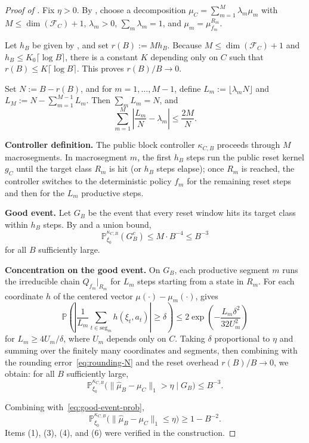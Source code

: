 \documentclass[12pt,a4paper]{article}
\theoremstyle{definition}
\begin{document}
\begin{proof}[Proof of ]
Fix $\eta > 0$. By , choose a decomposition $\mu_C = \sum_{m=1}^M \lambda_m \mu_m$ with $M \leq \dim(\mathcal{F}_C) + 1$, $\lambda_m > 0$, $\sum_m \lambda_m = 1$, and $\mu_m = \mu_{f_m}^{R_m}$.

Let $h_B$ be given by , and set $r(B) := M h_B$. Because $M \leq \dim(\mathcal{F}_C) + 1$ and $h_B \leq K_0 \lceil \log B \rceil$, there is a constant $K$ depending only on $C$ such that $r(B) \leq K \lceil \log B \rceil$. This proves $r(B)/B \to 0$.

Set $N := B - r(B)$, and for $m = 1, \ldots, M-1$, define $L_m := \lfloor \lambda_m N \rfloor$ and $L_M := N - \sum_{m=1}^{M-1} L_m$. Then $\sum_m L_m = N$, and
\begin{equation}\label{eq:rounding-N}
\sum_{m=1}^M \left|\frac{L_m}{N} - \lambda_m\right| \leq \frac{2M}{N}.
\end{equation}

\textbf{Controller definition.}  The public block controller $\kappa_{C,B}$ proceeds through $M$ macrosegments.  In macrosegment $m$, the first $h_B$ steps run the public reset kernel $g_C$ until the target class $R_m$ is hit (or $h_B$ steps elapse); once $R_m$ is reached, the controller switches to the deterministic policy $f_m$ for the remaining reset steps and then for the $L_m$ productive steps.

\textbf{Good event.}  Let $G_B$ be the event that every reset window hits its target class within $h_B$ steps. By  and a union bound,
\begin{equation}\label{eq:good-event-prob}
\mathbb{P}_{\xi_0}^{\kappa_{C,B}}(G_B^c) \leq M \cdot B^{-4} \leq B^{-3}
\end{equation}
for all $B$ sufficiently large.

\textbf{Concentration on the good event.}  On $G_B$, each productive segment $m$ runs the irreducible chain $Q_{f_m}|_{R_m}$ for $L_m$ steps starting from a state in $R_m$. For each coordinate $h$ of the centered vector $\mu(\cdot) - \mu_m(\cdot)$,  gives
\[
\mathbb{P}\!\left(\left|\frac{1}{L_m}\sum_{t \in \text{seg}_m} h(\xi_t, a_t)\right| \geq \delta\right) \leq 2\exp\!\left(-\frac{L_m \delta^2}{32 U_m^2}\right)
\]
for $L_m \geq 4U_m/\delta$, where $U_m$ depends only on $C$. Taking $\delta$ proportional to $\eta$ and summing over the finitely many coordinates and segments, then combining with the rounding error~\eqref{eq:rounding-N} and the reset overhead $r(B)/B \to 0$, we obtain: for all $B$ sufficiently large,
\[
\mathbb{P}_{\xi_0}^{\kappa_{C,B}}\!\bigl(\|\hat\mu_B - \mu_C\|_1 > \eta \mid G_B\bigr) \leq B^{-3}.
\]

Combining with~\eqref{eq:good-event-prob},
\[
\mathbb{P}_{\xi_0}^{\kappa_{C,B}}\!\bigl(\|\hat\mu_B - \mu_C\|_1 \leq \eta\bigr) \geq 1 - B^{-2}.
\]
Items (1), (3), (4), and (6) were verified in the construction.
\end{proof}
\end{document}
